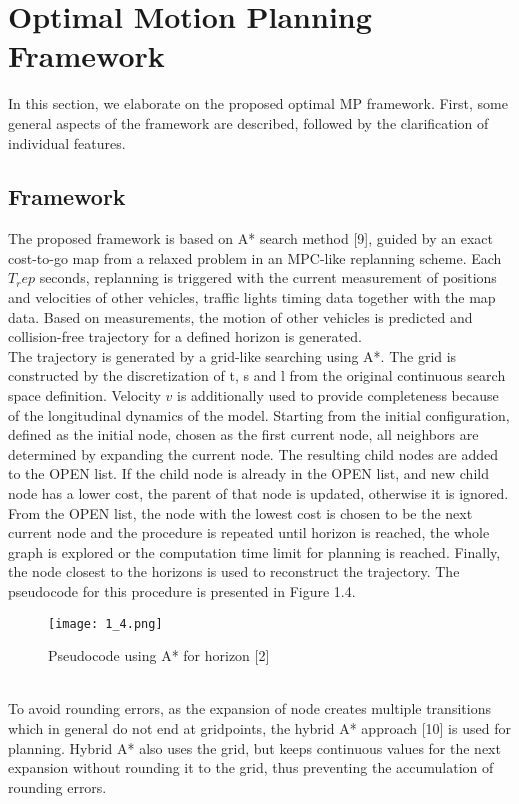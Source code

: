 \documentclass{report}
\begin{document}
 \section{Optimal Motion Planning Framework}
 In this section, we elaborate on the proposed optimal MP framework. First, some general aspects of the framework are described, followed by the clarification of individual features.
 \subsection{Framework}
 The proposed framework is based on A* search method [9], guided by an exact cost-to-go map from a relaxed problem in an MPC-like replanning scheme. Each $T_rep$ seconds, replanning is triggered with the current measurement of positions and velocities of other vehicles, traffic lights timing data together with the map data. Based on measurements, the motion of other vehicles is predicted and collision-free trajectory for a defined horizon is generated.\\
 \indent
 The trajectory is generated by a grid-like searching using A*. The grid is constructed by the discretization of t, s and l from the original continuous search space definition. Velocity $v$ is additionally used to provide completeness because of the longitudinal dynamics of the model. Starting from the initial configuration, defined as the initial node, chosen as the first current node, all neighbors are determined by expanding the current node. The resulting child nodes are added to the OPEN list. If the child node is already in the OPEN list, and new child node has a lower cost, the parent of that node is updated, otherwise it is ignored. From the OPEN list, the
 node with the lowest cost is chosen to be the next current node and the procedure is repeated until horizon is reached, the whole graph is explored or the computation time limit for planning is reached. Finally, the node closest to the horizons is used to reconstruct the trajectory. The pseudocode for this procedure is presented in Figure 1.4.
   \begin{figure}[ht]
 	\centering
 	\texttt{[image: 1\_4.png]}
 	\caption{Pseudocode using A* for horizon
 		[2]}
 	\label{fig:1.4} 
 \end{figure}\\
\indent
To avoid rounding errors, as the expansion of node creates multiple transitions which in general do not end at gridpoints, the hybrid A* approach [10] is used for planning. Hybrid A* also uses the grid, but keeps continuous values for the next expansion without rounding it to the grid, thus preventing the accumulation of rounding errors.\\
\end{document}

